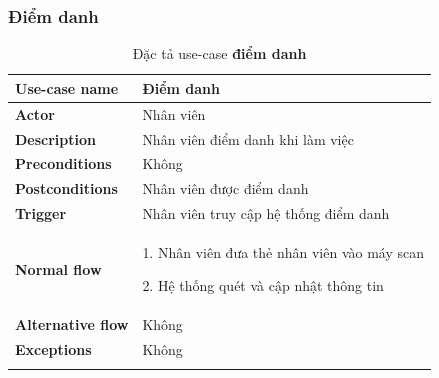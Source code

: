         \subsubsection{Điểm danh}
            \begin{longtable}{| p{} | p{} |} 
                \hline
                    \textbf{Use-case name} 
                & 
                    Điểm danh
                \\
                \hline
                    \textbf{Actor} 
                & 
                    Nhân viên
                \\
                \hline
                    \textbf{Description} 
                & 
                    Nhân viên điểm danh khi làm việc
                \\
                \hline
                    \textbf{Preconditions} 
                &
                    Không
                \\
                \hline
                    \textbf{Postconditions} 
                & 
                    Nhân viên được điểm danh
                \\
                \hline
                    \textbf{Trigger} 
                & 
                    Nhân viên truy cập hệ thống điểm danh
                \\
                \hline
                    \textbf{Normal flow}
                & 
                1. Nhân viên đưa thẻ nhân viên vào máy scan
                    
                    2. Hệ thống quét và cập nhật thông tin
                \\
                \hline
                    \textbf{Alternative flow}
                &
                    Không
                \\
                \hline
                    \textbf{Exceptions} 
                &
                    Không
                \\
                \hline
                \caption{Đặc tả use-case \textbf{điểm danh}}
            \end{longtable}

   \newpage         
    
